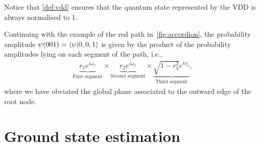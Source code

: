 \documentclass{ieeeaccess}
\begin{document}
Notice that \cref{def:vdd} ensures that the quantum state represented by the VDD is always normalised to 1.

Continuing with the example of the red path in~\cref{fig:accordion}, the probability amplitude $\psi(001) = \braket{\psi}{0,0,1}$ is given by the product of the probability amplitudes lying on each segment of the path, i.e.,
\begin{align}
    \underbrace{r_1e^{i\omega_1}}_{\text{First segment}}\times\underbrace{r_2e^{i\omega_2}}_{\text{Second segment}}\times\underbrace{\sqrt{1-r_4^2}e^{i\phi_4}}_\text{Third segment},\label{eq:prob_amplitude_example}
\end{align}
where we have obviated the global phase associated to the outward edge of the root node.

\section{Ground state estimation}\label{sec:gse}
\end{document}
